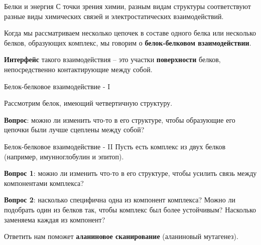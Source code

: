 \documentclass[12pt, xcolor={dvipsnames}]{beamer}
\begin{document}
\begin{frame}{Белки и энергия}
С точки зрения химии, разным видам структуры соответствуют разные виды химических связей и электростатических взаимодействий.

Когда мы рассматриваем несколько цепочек в составе одного белка или несколько белков, образующих комплекс, мы говорим о \textbf{белок-белковом взаимодействии}.

\textbf{Интерфейс} такого взаимодействия -- это участки \textbf{поверхности} белков, непосредственно контактирующие между собой.

\end{frame}
\begin{frame}{Белок-белковое взаимодействие - I}
\begin{center}
\end{center}
Рассмотрим белок, имеющий четвертичную структуру.

\textbf{Вопрос}: можно ли изменить что-то в его структуре, чтобы образующие его цепочки были лучше сцеплены между собой?
\end{frame}
\begin{frame}{Белок-белковое взаимодействие - II}
Пусть есть комплекс из двух белков (например, имунноглобулин и эпитоп).

\textbf{Вопрос 1}: можно ли изменить что-то в его структуре, чтобы усилить связь между компонентами комплекса?

\textbf{Вопрос 2}: насколько специфична одна из компонент комплекса?  Можно ли подобрать один из белков так, чтобы комплекс был более устойчивым? Насколько заменяема каждая из компонент?

Ответить нам поможет \textbf{аланиновое сканирование} (аланиновый мутагенез).
\end{frame}
\end{document}

